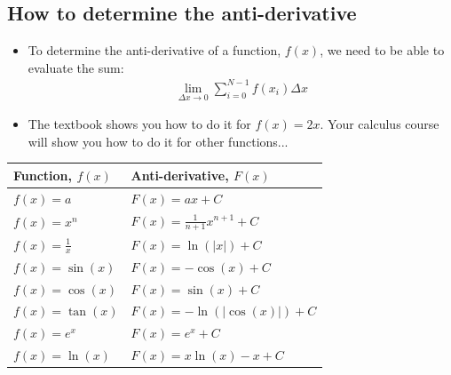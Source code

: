 \documentclass[aspectratio=169,
hyperref={colorlinks,urlcolor=blue}
]{beamer}
\begin{document}
\subsection{How to determine the anti-derivative}
\label{subsec:determiningantider}
{
\begin{itemize}
\item To determine the anti-derivative of a function, $f(x)$, we need to be able to evaluate the sum:
\begin{align*}
\lim_{\Delta x \to 0}\sum_{i=0}^{N-1}f(x_i)\Delta x
\end{align*}
\item The textbook shows you how to do it for $f(x)=2x$. Your calculus course will show you how to do it for other functions...
\end{itemize}
}
{
\begin{center}
\scriptsize
\begin{tabular}{l l}
\textbf{Function, $f(x)$} & \textbf{Anti-derivative, $F(x)$}\\
\hline\hline
$f(x)=a$ & $F(x)=ax+C$ \\
$f(x)=x^n$ & $F(x)=\frac{1}{n+1}x^{n+1}+C$ \\
$f(x)=\frac{1}{x}$ & $F(x)=\ln(|x|)+C$ \\
$f(x)=\sin(x)$ & $F(x)=-\cos(x)+C$ \\
$f(x)=\cos(x)$ & $F(x)=\sin(x)+C$ \\
$f(x)=\tan(x)$ & $F(x)=-\ln(|\cos(x)|)+C$ \\
$f(x)=e^x$ & $F(x)=e^x+C$ \\
$f(x)=\ln(x)$ & $F(x)=x\ln(x)-x+C$ \\
\hline
\end{tabular}
\end{center}
}
\end{document}
